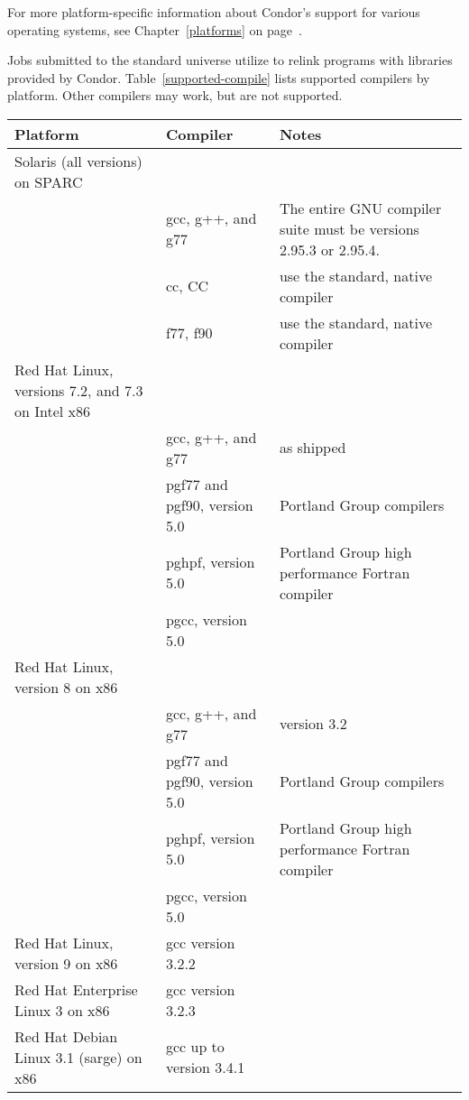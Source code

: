 For more platform-specific information about Condor's support for
various operating systems, see Chapter~\ref{platforms} on
page~\pageref{platforms}. 



Jobs submitted to the standard universe utilize 
to relink programs with libraries provided by Condor.
Table~\ref{supported-compile} lists supported compilers by
platform.
Other compilers may work, but are not supported.


\begin{center}
\begin{table}[hbt]
\begin{tabular}{|ll|l}
\textbf{Platform} & \textbf{Compiler} & \textbf{Notes}\\ \hline \hline
Solaris (all versions) on SPARC \\ 
& gcc, g++, and g77 & The entire GNU compiler suite must be versions 2.95.3 or 2.95.4. \\ 
& cc, CC & use the standard, native compiler \\ 
& f77, f90 & use the standard, native compiler \\ 
\hline
Red Hat Linux, versions 7.2, and 7.3 on Intel x86 \\ 
& gcc, g++, and g77 & as shipped \\ 
& pgf77 and pgf90, version 5.0 & Portland Group compilers \\ 
& pghpf, version 5.0 & Portland Group high performance Fortran compiler \\ 
& pgcc, version 5.0 \\ 
\hline
Red Hat Linux, version 8 on x86 \\ 
& gcc, g++, and g77 & version 3.2 \\ 
& pgf77 and pgf90, version 5.0 & Portland Group compilers \\ 
& pghpf, version 5.0 & Portland Group high performance Fortran compiler \\ 
& pgcc, version 5.0 \\ 
\hline
Red Hat Linux, version 9 on x86 & gcc version 3.2.2 \\ 
\hline
Red Hat Enterprise Linux 3 on x86 & gcc version 3.2.3 \\ 
\hline
Red Hat Debian Linux 3.1 (sarge) on x86 & gcc up to version 3.4.1 \\ 

\end{tabular}
\end{table}
\end{center}
